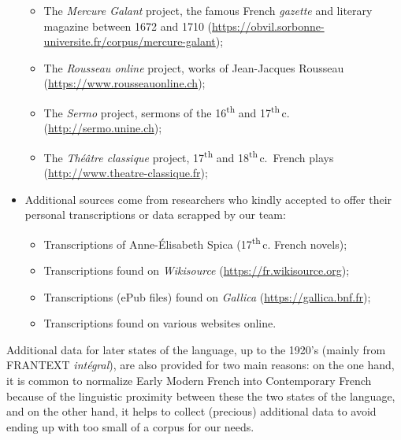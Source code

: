 \begin{itemize}
\begin{itemize}
              \item The \emph{Mercure Galant} project, the famous French \emph{gazette} and literary magazine between 1672 and 1710 (\url{https://obvil.sorbonne-universite.fr/corpus/mercure-galant});
              \item The \emph{Rousseau online} project, works of Jean-Jacques Rousseau (\url{https://www.rousseauonline.ch});
              \item The \emph{Sermo} project, sermons of the 16\textsuperscript{th} and 17\textsuperscript{th}\,c. (\url{http://sermo.unine.ch});
              \item The \emph{Théâtre classique} project, 17\textsuperscript{th} and 18\textsuperscript{th}\,c.~French plays (\url{http://www.theatre-classique.fr});
          \end{itemize}
    \item Additional sources come from researchers who kindly accepted to offer their personal transcriptions or data scrapped by our team:
          \begin{itemize}
              \item Transcriptions of Anne-Élisabeth Spica (17\textsuperscript{th}\,c. French novels);
              \item Transcriptions found on \emph{Wikisource} (\url{https://fr.wikisource.org});
              \item Transcriptions (ePub files) found on \emph{Gallica} (\url{https://gallica.bnf.fr});
              \item Transcriptions found on various websites online.
          \end{itemize}
\end{itemize}

Additional data for later states of the language, up to the 1920's (mainly from FRANTEXT \emph{intégral}), are also provided for two main reasons: on the one hand, it is common to normalize Early Modern French into Contemporary French \cite{gabay-2014-pourquoi} because of the linguistic proximity between these the two states of the language, and on the other hand, it helps to collect (precious) additional data to avoid ending up with too small of a corpus for our needs.

